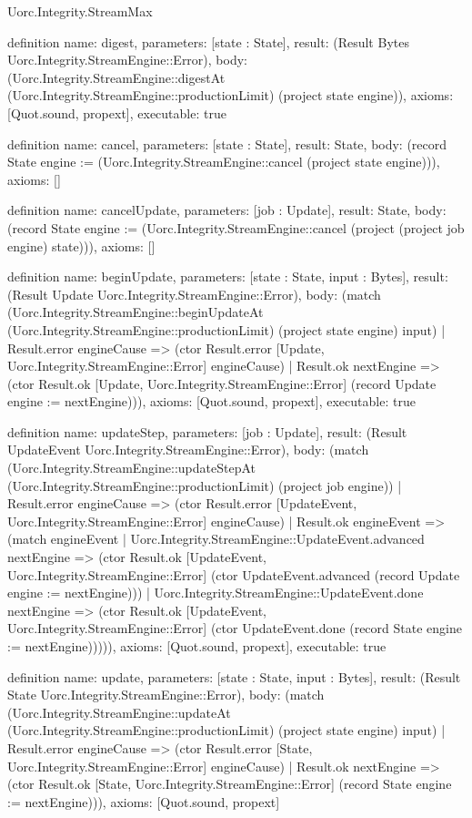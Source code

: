 \begin{lexlean}{Uorc.Integrity.StreamMax}
\begin{semanticmodule}
definition{
  name: digest,
  parameters: [state : State],
  result: (Result Bytes Uorc.Integrity.StreamEngine::Error),
  body: (Uorc.Integrity.StreamEngine::digestAt (Uorc.Integrity.StreamEngine::productionLimit) (project state engine)),
  axioms: [Quot.sound, propext],
  executable: true
}

definition{
  name: cancel,
  parameters: [state : State],
  result: State,
  body: (record State {engine := (Uorc.Integrity.StreamEngine::cancel (project state engine))}),
  axioms: []
}

definition{
  name: cancelUpdate,
  parameters: [job : Update],
  result: State,
  body: (record State {engine := (Uorc.Integrity.StreamEngine::cancel (project (project job engine) state))}),
  axioms: []
}

definition{
  name: beginUpdate,
  parameters: [state : State, input : Bytes],
  result: (Result Update Uorc.Integrity.StreamEngine::Error),
  body: (match (Uorc.Integrity.StreamEngine::beginUpdateAt (Uorc.Integrity.StreamEngine::productionLimit) (project state engine) input)
    | Result.error engineCause => (ctor Result.error [Update, Uorc.Integrity.StreamEngine::Error] engineCause)
    | Result.ok nextEngine => (ctor Result.ok [Update, Uorc.Integrity.StreamEngine::Error] (record Update {engine := nextEngine}))),
  axioms: [Quot.sound, propext],
  executable: true
}

definition{
  name: updateStep,
  parameters: [job : Update],
  result: (Result UpdateEvent Uorc.Integrity.StreamEngine::Error),
  body: (match (Uorc.Integrity.StreamEngine::updateStepAt (Uorc.Integrity.StreamEngine::productionLimit) (project job engine))
    | Result.error engineCause => (ctor Result.error [UpdateEvent, Uorc.Integrity.StreamEngine::Error] engineCause)
    | Result.ok engineEvent => (match engineEvent
      | Uorc.Integrity.StreamEngine::UpdateEvent.advanced nextEngine => (ctor Result.ok [UpdateEvent, Uorc.Integrity.StreamEngine::Error] (ctor UpdateEvent.advanced (record Update {engine := nextEngine})))
      | Uorc.Integrity.StreamEngine::UpdateEvent.done nextEngine => (ctor Result.ok [UpdateEvent, Uorc.Integrity.StreamEngine::Error] (ctor UpdateEvent.done (record State {engine := nextEngine}))))),
  axioms: [Quot.sound, propext],
  executable: true
}

definition{
  name: update,
  parameters: [state : State, input : Bytes],
  result: (Result State Uorc.Integrity.StreamEngine::Error),
  body: (match (Uorc.Integrity.StreamEngine::updateAt (Uorc.Integrity.StreamEngine::productionLimit) (project state engine) input)
    | Result.error engineCause => (ctor Result.error [State, Uorc.Integrity.StreamEngine::Error] engineCause)
    | Result.ok nextEngine => (ctor Result.ok [State, Uorc.Integrity.StreamEngine::Error] (record State {engine := nextEngine}))),
  axioms: [Quot.sound, propext]
}


\end{semanticmodule}
\end{lexlean}
